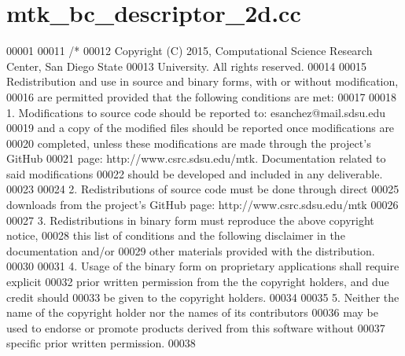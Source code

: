 \hypertarget{mtk__bc__descriptor__2d_8cc_source}{\section{mtk\+\_\+bc\+\_\+descriptor\+\_\+2d.\+cc}
\label{mtk__bc__descriptor__2d_8cc_source}
}

\begin{DoxyCode}
00001 
00011 \textcolor{comment}{/*}
00012 \textcolor{comment}{Copyright (C) 2015, Computational Science Research Center, San Diego State}
00013 \textcolor{comment}{University. All rights reserved.}
00014 \textcolor{comment}{}
00015 \textcolor{comment}{Redistribution and use in source and binary forms, with or without modification,}
00016 \textcolor{comment}{are permitted provided that the following conditions are met:}
00017 \textcolor{comment}{}
00018 \textcolor{comment}{1. Modifications to source code should be reported to: esanchez@mail.sdsu.edu}
00019 \textcolor{comment}{and a copy of the modified files should be reported once modifications are}
00020 \textcolor{comment}{completed, unless these modifications are made through the project's GitHub}
00021 \textcolor{comment}{page: http://www.csrc.sdsu.edu/mtk. Documentation related to said modifications}
00022 \textcolor{comment}{should be developed and included in any deliverable.}
00023 \textcolor{comment}{}
00024 \textcolor{comment}{2. Redistributions of source code must be done through direct}
00025 \textcolor{comment}{downloads from the project's GitHub page: http://www.csrc.sdsu.edu/mtk}
00026 \textcolor{comment}{}
00027 \textcolor{comment}{3. Redistributions in binary form must reproduce the above copyright notice,}
00028 \textcolor{comment}{this list of conditions and the following disclaimer in the documentation and/or}
00029 \textcolor{comment}{other materials provided with the distribution.}
00030 \textcolor{comment}{}
00031 \textcolor{comment}{4. Usage of the binary form on proprietary applications shall require explicit}
00032 \textcolor{comment}{prior written permission from the the copyright holders, and due credit should}
00033 \textcolor{comment}{be given to the copyright holders.}
00034 \textcolor{comment}{}
00035 \textcolor{comment}{5. Neither the name of the copyright holder nor the names of its contributors}
00036 \textcolor{comment}{may be used to endorse or promote products derived from this software without}
00037 \textcolor{comment}{specific prior written permission.}
00038 \textcolor{comment}{}

\end{DoxyCode}

